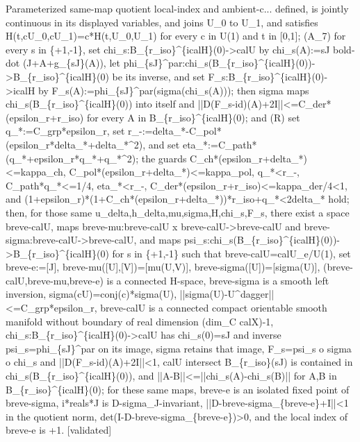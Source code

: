 \documentclass{article}
\newcommand{\steptag}[1]{\hfill{\small\textsf{[#1]}}}
\begin{document}
\begin{proofbox}{Parameterized same-map quotient local-index and ambient-c...}
defined, is jointly continuous in its displayed variables, and joins U\_0 to U\_1, and satisfies H(t,cU\_0,cU\_1)=c*H(t,U\_0,U\_1) for every c in U(1) and t in [0,1]; (A\_7) for every s in \{+1,-1\}, set chi\_s:B\_\{r\_iso\}\textasciicircum{}\{icalH\}(0)->calU by chi\_s(A):=sJ bold-dot (J+A+g\_\{sJ\}(A)), let phi\_\{sJ\}\textasciicircum{}par:chi\_s(B\_\{r\_iso\}\textasciicircum{}\{icalH\}(0))->B\_\{r\_iso\}\textasciicircum{}\{icalH\}(0) be its inverse, and set F\_s:B\_\{r\_iso\}\textasciicircum{}\{icalH\}(0)->icalH by F\_s(A):=phi\_\{sJ\}\textasciicircum{}par(sigma(chi\_s(A))); then sigma maps chi\_s(B\_\{r\_iso\}\textasciicircum{}\{icalH\}(0)) into itself and ||D(F\_s-id)(A)+2I||<=C\_der*(epsilon\_r+r\_iso) for every A in B\_\{r\_iso\}\textasciicircum{}\{icalH\}(0); and (R) set q\_*:=C\_grp*epsilon\_r, set r\_-:=delta\_*-C\_pol*(epsilon\_r*delta\_*+delta\_*\textasciicircum{}2), and set eta\_*:=C\_path*(q\_*+epsilon\_r*q\_*+q\_*\textasciicircum{}2); the guards C\_ch*(epsilon\_r+delta\_*)<=kappa\_ch, C\_pol*(epsilon\_r+delta\_*)<=kappa\_pol, q\_*<r\_-, C\_path*q\_*<=1/4, eta\_*<r\_-, C\_der*(epsilon\_r+r\_iso)<=kappa\_der/4<1, and (1+epsilon\_r)*(1+C\_ch*(epsilon\_r+delta\_*))*r\_iso+q\_*<2delta\_* hold; then, for those same u\_delta,h\_delta,mu,sigma,H,chi\_s,F\_s, there exist a space breve-calU, maps breve-mu:breve-calU x breve-calU->breve-calU and breve-sigma:breve-calU->breve-calU, and maps psi\_s:chi\_s(B\_\{r\_iso\}\textasciicircum{}\{icalH\}(0))->B\_\{r\_iso\}\textasciicircum{}\{icalH\}(0) for s in \{+1,-1\} such that breve-calU=calU\_e/U(1), set breve-e:=[J], breve-mu([U],[V])=[mu(U,V)], breve-sigma([U])=[sigma(U)], (breve-calU,breve-mu,breve-e) is a connected H-space, breve-sigma is a smooth left inversion, sigma(cU)=conj(c)*sigma(U), ||sigma(U)-U\textasciicircum{}dagger||<=C\_grp*epsilon\_r, breve-calU is a connected compact orientable smooth manifold without boundary of real dimension (dim\_C calX)-1, chi\_s:B\_\{r\_iso\}\textasciicircum{}\{icalH\}(0)->calU has chi\_s(0)=sJ and inverse psi\_s=phi\_\{sJ\}\textasciicircum{}par on its image, sigma retains that image, F\_s=psi\_s o sigma o chi\_s and ||D(F\_s-id)(A)+2I||<1, calU intersect B\_\{r\_iso\}(sJ) is contained in chi\_s(B\_\{r\_iso\}\textasciicircum{}\{icalH\}(0)), and ||A-B||<=||chi\_s(A)-chi\_s(B)|| for A,B in B\_\{r\_iso\}\textasciicircum{}\{icalH\}(0); for these same maps, breve-e is an isolated fixed point of breve-sigma, i*reals*J is D-sigma\_J-invariant, ||D-breve-sigma\_\{breve-e\}+I||<1 in the quotient norm, det(I-D-breve-sigma\_\{breve-e\})>0, and the local index of breve-e is +1. \steptag{validated} \\[6pt]

\end{proofbox}
\end{document}
